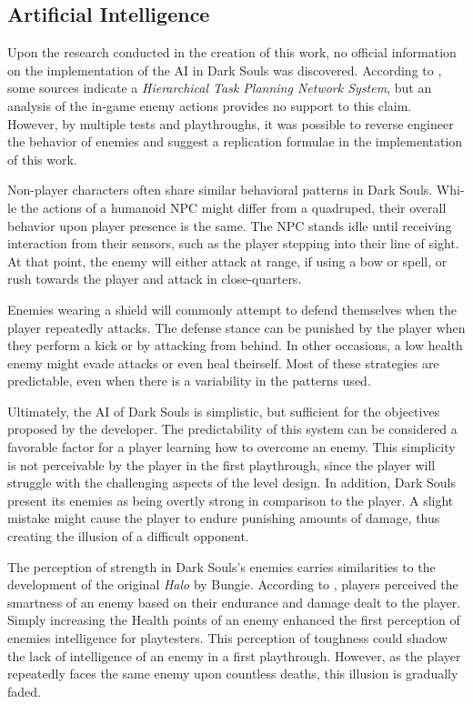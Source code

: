\subsection{Artificial Intelligence}

Upon the research conducted in the creation of this work, no official information on the implementation of the AI in Dark Souls was discovered. According to , some sources indicate a \emph{Hierarchical Task Planning Network System}, but an analysis of the in-game enemy actions provides no support to this claim. However, by multiple tests and playthroughs, it was possible to reverse engineer the behavior of enemies and suggest a replication formulae in the implementation of this work.

Non-player characters often share similar behavioral patterns in Dark Souls. Whi\hyp{}le the actions of a humanoid NPC might differ from a quadruped, their overall behavior upon player presence is the same. The NPC stands idle until receiving interaction from their sensors, such as the player stepping into their line of sight. At that point, the enemy will either attack at range, if using a bow or spell, or rush towards the player and attack in close-quarters.

Enemies wearing a shield will commonly attempt to defend themselves when the player repeatedly attacks. The defense stance can be punished by the player when they perform a kick or by attacking from behind. In other occasions, a low health enemy might evade attacks or even heal theirself. Most of these strategies are predictable, even when there is a variability in the patterns used.

Ultimately, the AI of Dark Souls is simplistic, but sufficient for the objectives proposed by the developer. The predictability of this system can be considered a favorable factor for a player learning how to overcome an enemy. This simplicity is not perceivable by the player in the first playthrough, since the player will struggle with the challenging aspects of the level design. In addition, Dark Souls present its enemies as being overtly strong in comparison to the player. A slight mistake might cause the player to endure punishing amounts of damage, thus creating the illusion of a difficult opponent.

The perception of strength in Dark Souls's enemies carries similarities to the development of the original \emph{Halo} by Bungie. According to , players perceived the smartness of an enemy based on their endurance and damage dealt to the player. Simply increasing the Health points of an enemy enhanced the first perception of enemies intelligence for playtesters. This perception of toughness could shadow the lack of intelligence of an enemy in a first playthrough. However, as the player repeatedly faces the same enemy upon countless deaths, this illusion is gradually faded.

